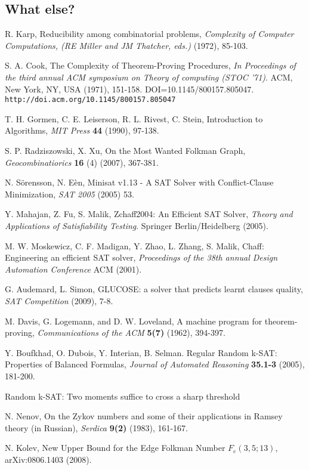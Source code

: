 \documentclass[paper=a4, fontsize=11pt]{scrartcl} %
\begin{document}
\subsection{What else?}

\begin{thebibliography}{9}

 R. Karp, Reducibility among combinatorial problems, \emph{Complexity of Computer Computations, (RE Miller and JM Thatcher, eds.)} (1972), 85-103.

 S. A. Cook, The Complexity of Theorem-Proving Procedures, \emph{In Proceedings of the third annual ACM symposium on Theory of computing (STOC '71)}. ACM, New York, NY, USA (1971), 151-158. DOI=10.1145/800157.805047. {\tt http://doi.acm.org/10.1145/800157.805047}

 T. H. Gormen, C. E. Leiserson, R. L. Rivest, C. Stein, Introduction to Algorithms, \emph{MIT Press} \textbf{44} (1990), 97-138.

 S. P. Radziszowski, X. Xu, On the Most Wanted Folkman Graph, \emph{Geocombinatiorics} \textbf{16} (4) (2007), 367-381.

 N. S\"{o}rensson, N. E\`{e}n, Minisat v1.13 - A SAT Solver with Conflict-Clause Minimization, \emph{SAT 2005} (2005) 53.

 Y. Mahajan, Z. Fu, S. Malik, Zchaff2004: An Efficient SAT Solver, \emph{Theory and Applications of Satisfiability Testing}. Springer Berlin/Heidelberg (2005).

 M. W. Moskewicz, C. F. Madigan, Y. Zhao, L. Zhang, S. Malik, Chaff: Engineering an efficient SAT solver, \emph{Proceedings of the 38th annual Design Automation Conference} ACM (2001).

 G. Audemard, L. Simon, GLUCOSE: a solver that predicts learnt clauses quality, \emph{SAT Competition} (2009), 7-8.

 M. Davis, G. Logemann, and D. W. Loveland, A machine program for theorem-proving, \emph{Communications of the ACM} \textbf{5(7)} (1962), 394-397.

 Y. Boufkhad, O. Dubois, Y. Interian, B. Selman. Regular Random k-SAT: Properties of Balanced Formulas, \emph{Journal of Automated Reasoning} \textbf{35.1-3} (2005), 181-200.

 Random k-SAT: Two moments suffice to cross a sharp threshold

 N. Nenov, On the Zykov numbers and some of their applications in Ramsey theory (in Russian), \emph{Serdica} \textbf{9(2)} (1983), 161-167.

 N. Kolev, New Upper Bound for the Edge Folkman Number $F_e(3,5;13)$, arXiv:0806.1403 (2008).

\end{thebibliography}
\end{document}
